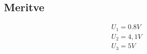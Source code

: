 \documentclass[a4paper]{article}
\begin{document}
\subsection*{Meritve}
\begin{gather}
   U_1 = 0.8V \\
   U_2 = 4,1V \\
   U_3 = 5V \\
\end{gather}
\end{document}

